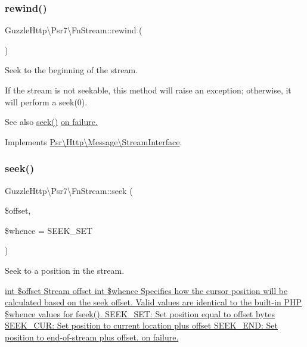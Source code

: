 \subsubsection{\texorpdfstring{rewind()}{rewind()}}
{\footnotesize\ttfamily Guzzle\+Http\textbackslash{}\+Psr7\textbackslash{}\+Fn\+Stream\+::rewind (\begin{DoxyParamCaption}{ }\end{DoxyParamCaption})}

Seek to the beginning of the stream.

If the stream is not seekable, this method will raise an exception; otherwise, it will perform a seek(0).

\begin{DoxySeeAlso}{See also}
\hyperlink{classGuzzleHttp_1_1Psr7_1_1FnStream_ae1f0b15fdfdf1e432c66ed01127cb01a}{seek()} \hyperlink{}{on failure. }
\end{DoxySeeAlso}


Implements \hyperlink{interfacePsr_1_1Http_1_1Message_1_1StreamInterface_a48721ef4d5097250a3f94515938393c9}{Psr\textbackslash{}\+Http\textbackslash{}\+Message\textbackslash{}\+Stream\+Interface}.

\mbox{\label{classGuzzleHttp_1_1Psr7_1_1FnStream_ae1f0b15fdfdf1e432c66ed01127cb01a}} 
\subsubsection{\texorpdfstring{seek()}{seek()}}
{\footnotesize\ttfamily Guzzle\+Http\textbackslash{}\+Psr7\textbackslash{}\+Fn\+Stream\+::seek (\begin{DoxyParamCaption}\item[{}]{\$offset,  }\item[{}]{\$whence = {\ttfamily SEEK\+\_\+SET} }\end{DoxyParamCaption})}

Seek to a position in the stream.

\hyperlink{}{int \$offset Stream offset  int \$whence Specifies how the cursor position will be calculated based on the seek offset. Valid values are identical to the built-\/in P\+HP \$whence values for {\ttfamily fseek()}. S\+E\+E\+K\+\_\+\+S\+E\+T\+: Set position equal to offset bytes S\+E\+E\+K\+\_\+\+C\+U\+R\+: Set position to current location plus offset S\+E\+E\+K\+\_\+\+E\+N\+D\+: Set position to end-\/of-\/stream plus offset.   on failure. }

